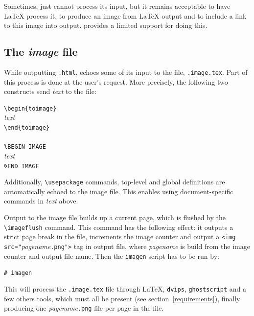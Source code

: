 Sometimes,
\hevea{} just cannot process its input, but it remains acceptable to
have \LaTeX{} process it, to produce an image from
\LaTeX{} output and to include a link to this image into \hevea{}
output.
\hevea{} provides a limited support for doing this.

\subsection{The \textit{image}\label{image:file} file}

While outputting \texttt{.html}, \hevea{} echoes some
of its input to the  file,
\texttt{.image.tex}.
Part of this process is done at the user's request.
More precisely, the following two constructs
send \textit{text} to the  file:
\begin{flushleft}
\verb+\begin{toimage}+\\
\textit{text}\\
\verb+\end{toimage}+\\
~\\
\verb+%BEGIN IMAGE+\\
\textit{text}\\
\verb+%END IMAGE+
\end{flushleft}
Additionally, \verb+\usepackage+ commands, top-level and global
definitions
are automatically echoed to the image file. This enables using
document-specific commands in \textit{text} above.


Output to the image file builds up a current page, which is flushed
by the \verb+\imageflush+ command.
This command has the following effect:  it outputs a strict page break
in the  file, increments the image counter and
output a \verb+<img src="+\textit{pagename}\verb+.png">+ tag in \hevea{}
output file, where \textit{pagename} is build from the image counter
and \hevea{} output file name.
Then the \verb+imagen+ script has to be run by:
\begin{flushleft}
\verb+# imagen+ 
\end{flushleft}
\noindent This will process the \texttt{.image.tex}
file through \LaTeX,
\texttt{dvips}, \texttt{ghostscript} and a few others tools, which must all be
present  (see section~\ref{requirements}), finally producing one
\textit{pagename}\texttt{.png} file per page in the 
file.

